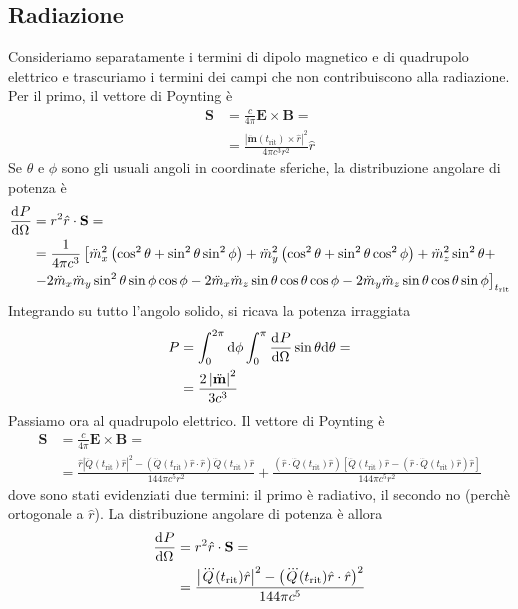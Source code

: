 \documentclass[a4paper,11pt]{article}
\renewcommand{\d}{\mathrm{d}}
\renewcommand{\vec}[1]{\mathbf{#1}}
\renewcommand{\t}{t_{\mathrm{rit}}}
\begin{document}
\subsection{Radiazione}
Consideriamo separatamente i termini di dipolo magnetico e di quadrupolo elettrico e trascuriamo i termini dei campi che non contribuiscono alla radiazione. Per il primo, il vettore di Poynting è
\begin{align*}
	\vec{S}&=\frac{c}{4\pi}\vec{E}\times\vec{B}=\\&=\frac{\left|\ddot{\vec{m}}(\t)\times\hat{r}\right|^2}{4\pi c^3r^2}\hat{r}
\end{align*}
Se $\theta$ e $\phi$ sono gli usuali angoli in coordinate sferiche, la distribuzione angolare di potenza è
\begin{align*}\der{P}{\Omega}&=r^2\hat{r}\cdot\vec{S}=\\&=\frac{1}{4\pi c^3}\left[\ddot{m}_x^2\left(\cos^2\theta+\sin^2\theta\sin^2\phi\right)+\ddot{m}_y^2\left(\cos^2\theta+\sin^2\theta\cos^2\phi\right)+\ddot{m}_z^2\sin^2\theta+\right.\\&\left.-2\ddot{m}_x\ddot{m}_y\sin^2\theta\sin\phi\cos\phi-2\ddot{m}_x\ddot{m}_z\sin\theta\cos\theta\cos\phi-2\ddot{m}_y\ddot{m}_z\sin\theta\cos\theta\sin\phi\right]_{\t}\end{align*}
Integrando su tutto l'angolo solido, si ricava la potenza irraggiata
\begin{align*}
	P&=\int_{0}^{2\pi}\d\phi\int_{0}^{\pi}\der{P}{\Omega}\sin\theta\d\theta=\\&=\frac{2\left|\ddot{\vec{m}}\right|^2}{3c^3}
\end{align*}
Passiamo ora al quadrupolo elettrico. Il vettore di Poynting è
\begin{align*}
\vec{S}&=\frac{c}{4\pi}\vec{E}\times\vec{B}=\\&=\frac{\hat{r}\left|\dddot{Q}(\t)\hat{r}\right|^2-\left(\dddot Q(\t)\hat{r}\cdot\hat{r}\right)\dddot Q(\t)\hat{r}}{144\pi c^5r^2}+\frac{\left(\hat{r}\cdot\dddot{Q}(\t)\hat{r}\right)\left[\dddot{Q}(\t)\hat{r}-(\hat{r}\cdot\dddot{Q}(\t)\hat{r})\hat{r}\right]}{144\pi c^5r^2}
\end{align*}
dove sono stati evidenziati due termini: il primo è radiativo, il secondo no (perchè ortogonale a $\hat{r}$). La distribuzione angolare di potenza è allora
\begin{align*}
	\der{P}{\Omega}&=r^2\hat{r}\cdot\vec{S}=\\&=\frac{\left|\dddot{Q}(\t)\hat{r}\right|^2-\left(\dddot Q(\t)\hat{r}\cdot\hat{r}\right)^2}{144\pi c^5}
\end{align*}
\end{document}
